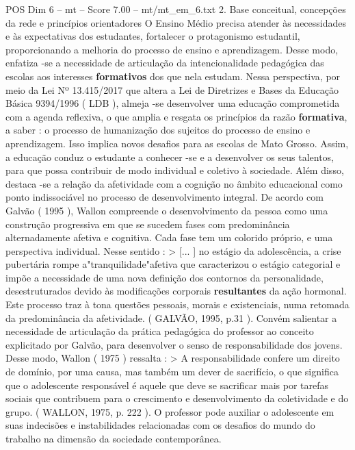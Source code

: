 \begin{textsample}{POS Dim 6 – mt – Score 7.00 – mt/mt\_em\_6.txt}  \label{ex:f6_pos_169}
2.
Base conceitual, concepções da rede e princípios orientadores O Ensino Médio precisa atender às necessidades e às expectativas dos estudantes, fortalecer o protagonismo estudantil, proporcionando a melhoria do processo de ensino e aprendizagem.
Desse modo, enfatiza -se a necessidade de articulação da intencionalidade pedagógica das escolas aos interesses \textbf{formativos} dos que nela estudam.
Nessa perspectiva, por meio da Lei Nº 13.415/2017 que altera a Lei de Diretrizes e Bases da Educação Básica 9394/1996 ( LDB ), almeja -se desenvolver uma educação comprometida com a agenda reflexiva, o que amplia e resgata os princípios da razão \textbf{formativa}, a saber : o processo de humanização dos sujeitos do processo de ensino e aprendizagem.
Isso implica novos desafios para as escolas de Mato Grosso.
Assim, a educação conduz o estudante a conhecer -se e a desenvolver os seus talentos, para que possa contribuir de modo individual e coletivo à sociedade.
Além disso, destaca -se a relação da afetividade com a cognição no âmbito educacional como ponto indissociável no processo de desenvolvimento integral.
De acordo com Galvão ( 1995 ), Wallon compreende o desenvolvimento da pessoa como uma construção progressiva em que se sucedem fases com predominância alternadamente afetiva e cognitiva.
Cada fase tem um colorido próprio, e uma perspectiva individual.
Nesse sentido : > [... ] no estágio da adolescência, a crise pubertária rompe a"tranquilidade"afetiva que caracterizou o estágio categorial e impõe a necessidade de uma nova definição dos contornos da personalidade, desestruturados devido às modificações corporais \textbf{resultantes} da ação hormonal.
Este processo traz à tona questões pessoais, morais e existenciais, numa retomada da predominância da afetividade. ( GALVÃO, 1995, p.31 ).
Convém salientar a necessidade de articulação da prática pedagógica do professor ao conceito explicitado por Galvão, para desenvolver o senso de responsabilidade dos jovens.
Desse modo, Wallon ( 1975 ) ressalta : > A responsabilidade confere um direito de domínio, por uma causa, mas também um dever de sacrifício, o que significa que o adolescente responsável é aquele que deve se sacrificar mais por tarefas sociais que contribuem para o crescimento e desenvolvimento da coletividade e do grupo. ( WALLON, 1975, p. 222 ).
O professor pode auxiliar o adolescente em suas indecisões e instabilidades relacionadas com os desafios do mundo do trabalho na dimensão da sociedade contemporânea.

\end{textsample}
